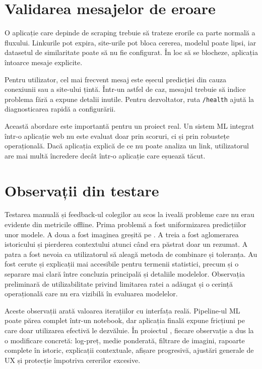 \section{Validarea mesajelor de eroare}
\label{sec:case-errors}

O aplicație care depinde de scraping trebuie să trateze erorile ca parte normală a fluxului. Linkurile pot expira, site-urile pot bloca cererea, modelul poate lipsi, iar datasetul de similaritate poate să nu fie configurat. În loc să se blocheze, aplicația întoarce mesaje explicite.

Pentru utilizator, cel mai frecvent mesaj este eșecul predicției din cauza conexiunii sau a site-ului țintă. Într-un astfel de caz, mesajul trebuie să indice problema fără a expune detalii inutile. Pentru dezvoltator, ruta \texttt{/health} ajută la diagnosticarea rapidă a configurării.

Această abordare este importantă pentru un proiect real. Un sistem ML integrat într-o aplicație web nu este evaluat doar prin scoruri, ci și prin robustețe operațională. Dacă aplicația explică de ce nu poate analiza un link, utilizatorul are mai multă încredere decât într-o aplicație care eșuează tăcut.

\section{Observații din testare}
\label{sec:case-observations}

Testarea manuală și feedback-ul colegilor au scos la iveală probleme care nu erau evidente din metricile offline. Prima problemă a fost uniformizarea predicțiilor unor modele. A doua a fost imaginea greșită pe \mobilede. A treia a fost aglomerarea istoricului și pierderea contextului atunci când era păstrat doar un rezumat. A patra a fost nevoia ca utilizatorul să aleagă metoda de combinare și toleranța. Au fost cerute și explicații mai accesibile pentru termenii statistici, precum și o separare mai clară între concluzia principală și detaliile modelelor. Observația preliminară de utilizabilitate privind limitarea ratei a adăugat și o cerință operațională care nu era vizibilă în evaluarea modelelor.

Aceste observații arată valoarea iterațiilor cu interfața reală. Pipeline-ul ML poate părea complet într-un notebook, dar aplicația finală expune fricțiuni pe care doar utilizarea efectivă le dezvăluie. În proiectul \project, fiecare observație a dus la o modificare concretă: log-preț, medie ponderată, filtrare de imagini, rapoarte complete în istoric, explicații contextuale, afișare progresivă, ajustări generale de UX și protecție împotriva cererilor excesive.

